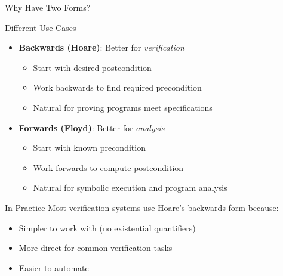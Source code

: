 \begin{frame}{Why Have Two Forms?}
    \begin{block}{Different Use Cases}
        \begin{itemize}
            \item \textbf{Backwards (Hoare)}: Better for \emph{verification}
                \begin{itemize}
                    \item Start with desired postcondition
                    \item Work backwards to find required precondition
                    \item Natural for proving programs meet specifications
                \end{itemize}
            \item \textbf{Forwards (Floyd)}: Better for \emph{analysis}
                \begin{itemize}
                    \item Start with known precondition
                    \item Work forwards to compute postcondition
                    \item Natural for symbolic execution and program analysis
                \end{itemize}
        \end{itemize}
    \end{block}
    
    \begin{block}{In Practice}
        Most verification systems use Hoare's backwards form because:
        \begin{itemize}
            \item Simpler to work with (no existential quantifiers)
            \item More direct for common verification tasks
            \item Easier to automate
        \end{itemize}
    \end{block}
\end{frame}